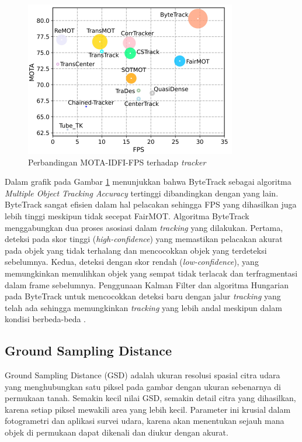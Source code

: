\begin{figure} [H] \centering
  \includegraphics[scale=0.8]{bab2/mota_bytetrack.png}
  \caption{Perbandingan MOTA-IDFI-FPS terhadap \emph{tracker}}
  \label{fig:mota-tracker}
\end{figure}

Dalam grafik pada Gambar \ref{fig:mota-tracker} menunjukkan bahwa ByteTrack sebagai algoritma \emph{Multiple Object Tracking Accuracy} tertinggi dibandingkan dengan yang lain. ByteTrack sangat efisien dalam hal pelacakan sehingga FPS yang dihasilkan juga lebih tinggi meskipun tidak secepat FairMOT. Algoritma ByteTrack menggabungkan dua proses asosiasi dalam \emph{tracking} yang dilakukan. Pertama, deteksi pada skor tinggi (\emph{high-confidence}) yang memastikan pelacakan akurat pada objek yang tidak terhalang dan mencocokkan objek yang terdeteksi sebelumnya. Kedua, deteksi dengan skor rendah (\emph{low-confidence}), yang memungkinkan memulihkan objek yang sempat tidak terlacak dan terfragmentasi dalam frame sebelumnya. Penggunaan Kalman Filter dan algoritma Hungarian pada ByteTrack untuk mencocokkan deteksi baru dengan jalur \emph{tracking} yang telah ada sehingga memungkinkan \emph{tracking} yang lebih andal meskipun dalam kondisi berbeda-beda \cite{Zhang2022ByteTrack}.

\subsection{Ground Sampling Distance}
Ground Sampling Distance (GSD) adalah ukuran resolusi spasial citra udara yang menghubungkan satu piksel pada gambar dengan ukuran sebenarnya di permukaan tanah. Semakin kecil nilai GSD, semakin detail citra yang dihasilkan, karena setiap piksel mewakili area yang lebih kecil. Parameter ini krusial dalam fotogrametri dan aplikasi survei udara, karena akan menentukan sejauh mana objek di permukaan dapat dikenali dan diukur dengan akurat.

